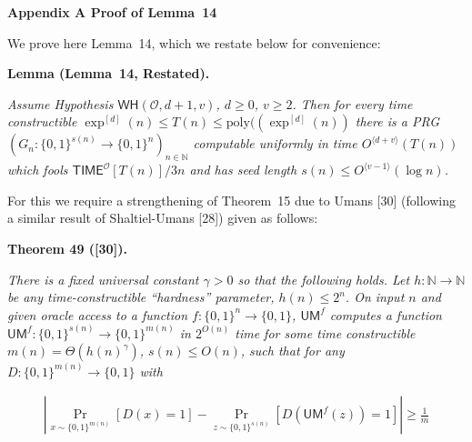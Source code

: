 \documentclass[10pt,a4paper]{article}
\begin{document}
\par\medskip\noindent\textbf{
Appendix A Proof of Lemma 14
}\par




We prove here Lemma 14, which we restate below for convenience:\par





\par\medskip\noindent\textbf{
\textbf{Lemma}\textbf{ }(Lemma 14, Restated)\textbf{.}
}\par



\emph{Assume Hypothesis $\mathsf{WH}(\mathcal{O},d+1,v)$, $d\geq 0$, $v\geq 2$. Then for every time constructible $\exp^{[d]}(n)\leq T(n)\leq\mathrm{poly}((\exp^{[d]}(n))$ there is a PRG $(G_{n}:\{0,1\}^{s(n)}\to\{0,1\}^{n})_{n\in\mathbb{N}}$ computable uniformly in time $O^{\langle d+v\rangle}(T(n))$ which fools ${\mathsf{TIME}}^{\mathcal{O}}[T(n)]/3n$ and has seed length $s(n)\leq O^{\langle v-1\rangle}(\log n)$.}\par






For this we require a strengthening of Theorem 15 due to Umans [30] (following a similar result of Shaltiel-Umans [28]) given as follows:\par





\par\medskip\noindent\textbf{
\textbf{Theorem 49}\textbf{ }([30])\textbf{.}
}\par



\emph{There is a fixed universal constant $\gamma>0$ so that the following holds. Let $h:\mathbb{N}\to\mathbb{N}$ be any time-constructible “hardness” parameter, $h(n)\leq 2^{n}$. On input $n$ and given oracle access to a function $f:\{0,1\}^{n}\to\{0,1\}$, $\mathsf{UM}^{f}$ computes a function $\mathsf{UM}^{f}:\{0,1\}^{s(n)}\to\{0,1\}^{m(n)}$ in $2^{O(n)}$ time for some time constructible $m(n)=\Theta(h(n)^{\gamma})$, $s(n)\leq O(n)$, such that for any $D:\{0,1\}^{m(n)}\to\{0,1\}$ with}\par


\[\begin{gathered}
|\Pr_{x\sim\{0,1\}^{m(n)}}[D(x)=1]-\Pr_{z\sim\{0,1\}^{s(n)}}[D(\mathsf{UM}^{f}(z))=1]|\geq\frac{1}{m}
\end{gathered}\]
\end{document}
